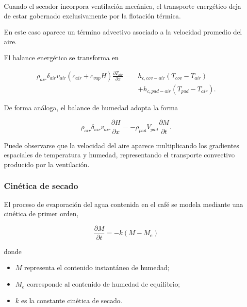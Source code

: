 Cuando el secador incorpora ventilación mecánica, el transporte energético deja de estar gobernado exclusivamente por la flotación térmica.

En este caso aparece un término advectivo asociado a la velocidad promedio del aire.

El balance energético se transforma en

\begin{equation}
\boxed{
\begin{aligned}
\rho_{air}\delta_{air}
v_{air}
(c_{air}+c_{vap}H)
\frac{\partial T_{air}}{\partial x}
=
&
h_{c,cov-air}(T_{cov}-T_{air})
\\
&
+
h_{c,pad-air}(T_{pad}-T_{air}).
\end{aligned}
}
\end{equation}

De forma análoga, el balance de humedad adopta la forma

\begin{equation}
\boxed{
\rho_{air}\delta_{air}
v_{air}
\frac{\partial H}{\partial x}
=
-
\rho_{pad}
V_{pad}
\frac{\partial M}{\partial t}.
}
\end{equation}

Puede observarse que la velocidad del aire aparece multiplicando los gradientes espaciales de temperatura y humedad, representando el transporte convectivo producido por la ventilación.

\subsubsection{Cinética de secado}

El proceso de evaporación del agua contenida en el café se modela mediante una cinética de primer orden,

\begin{equation}
\boxed{
\frac{\partial M}{\partial t}
=
-k(M-M_e)
}
\end{equation}

donde

\begin{itemize}

\item $M$ representa el contenido instantáneo de humedad;

\item $M_e$ corresponde al contenido de humedad de equilibrio;

\item $k$ es la constante cinética de secado.

\end{itemize}


